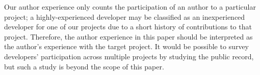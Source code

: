 Our author experience only counts the participation of an author to
a particular project; a highly-experienced developer may be classified as an
inexperienced developer for one of our projects due to a short history of
contributions to that project. 
Therefore, the author experience in this paper should be interpreted as the 
author's experience with the target project. 
It would be possible to
survey developers' participation across multiple projects by studying the public
record, but such a study is beyond the scope of this paper.

